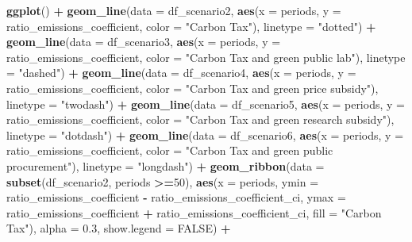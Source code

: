 \documentclass[
]{article}
\newenvironment{Shaded}{\begin{snugshade}}{\end{snugshade}}
\newcommand{\AttributeTok}[1]{\textcolor[rgb]{0.13,0.29,0.53}{#1}}
\newcommand{\ConstantTok}[1]{\textcolor[rgb]{0.56,0.35,0.01}{#1}}
\newcommand{\DecValTok}[1]{\textcolor[rgb]{0.00,0.00,0.81}{#1}}
\newcommand{\FloatTok}[1]{\textcolor[rgb]{0.00,0.00,0.81}{#1}}
\newcommand{\FunctionTok}[1]{\textcolor[rgb]{0.13,0.29,0.53}{\textbf{#1}}}
\newcommand{\NormalTok}[1]{#1}
\newcommand{\SpecialCharTok}[1]{\textcolor[rgb]{0.81,0.36,0.00}{\textbf{#1}}}
\newcommand{\StringTok}[1]{\textcolor[rgb]{0.31,0.60,0.02}{#1}}
\begin{document}
\begin{Shaded}
\begin{Highlighting}[]
\FunctionTok{ggplot}\NormalTok{() }\SpecialCharTok{+}
  \FunctionTok{geom\_line}\NormalTok{(}\AttributeTok{data =}\NormalTok{ df\_scenario2, }\FunctionTok{aes}\NormalTok{(}\AttributeTok{x =}\NormalTok{ periods, }\AttributeTok{y =}\NormalTok{ ratio\_emissions\_coefficient, }\AttributeTok{color =} \StringTok{"Carbon Tax"}\NormalTok{), }\AttributeTok{linetype =} \StringTok{"dotted"}\NormalTok{) }\SpecialCharTok{+}
  \FunctionTok{geom\_line}\NormalTok{(}\AttributeTok{data =}\NormalTok{ df\_scenario3, }\FunctionTok{aes}\NormalTok{(}\AttributeTok{x =}\NormalTok{ periods, }\AttributeTok{y =}\NormalTok{ ratio\_emissions\_coefficient, }\AttributeTok{color =} \StringTok{"Carbon Tax and green public lab"}\NormalTok{), }\AttributeTok{linetype =} \StringTok{"dashed"}\NormalTok{) }\SpecialCharTok{+}
  \FunctionTok{geom\_line}\NormalTok{(}\AttributeTok{data =}\NormalTok{ df\_scenario4, }\FunctionTok{aes}\NormalTok{(}\AttributeTok{x =}\NormalTok{ periods, }\AttributeTok{y =}\NormalTok{ ratio\_emissions\_coefficient, }\AttributeTok{color =} \StringTok{"Carbon Tax and green price subsidy"}\NormalTok{), }\AttributeTok{linetype =} \StringTok{"twodash"}\NormalTok{) }\SpecialCharTok{+}
  \FunctionTok{geom\_line}\NormalTok{(}\AttributeTok{data =}\NormalTok{ df\_scenario5, }\FunctionTok{aes}\NormalTok{(}\AttributeTok{x =}\NormalTok{ periods, }\AttributeTok{y =}\NormalTok{ ratio\_emissions\_coefficient, }\AttributeTok{color =} \StringTok{"Carbon Tax and green research subsidy"}\NormalTok{), }\AttributeTok{linetype =} \StringTok{"dotdash"}\NormalTok{) }\SpecialCharTok{+}
  \FunctionTok{geom\_line}\NormalTok{(}\AttributeTok{data =}\NormalTok{ df\_scenario6, }\FunctionTok{aes}\NormalTok{(}\AttributeTok{x =}\NormalTok{ periods, }\AttributeTok{y =}\NormalTok{ ratio\_emissions\_coefficient, }\AttributeTok{color =} \StringTok{"Carbon Tax and green public procurement"}\NormalTok{), }\AttributeTok{linetype =} \StringTok{"longdash"}\NormalTok{) }\SpecialCharTok{+}
  \FunctionTok{geom\_ribbon}\NormalTok{(}\AttributeTok{data =} \FunctionTok{subset}\NormalTok{(df\_scenario2, periods }\SpecialCharTok{\textgreater{}=}\DecValTok{50}\NormalTok{), }\FunctionTok{aes}\NormalTok{(}\AttributeTok{x =}\NormalTok{ periods, }\AttributeTok{ymin =}\NormalTok{ ratio\_emissions\_coefficient }\SpecialCharTok{{-}}\NormalTok{ ratio\_emissions\_coefficient\_ci, }\AttributeTok{ymax =}\NormalTok{ ratio\_emissions\_coefficient }\SpecialCharTok{+}\NormalTok{ ratio\_emissions\_coefficient\_ci, }\AttributeTok{fill =} \StringTok{"Carbon Tax"}\NormalTok{), }\AttributeTok{alpha =} \FloatTok{0.3}\NormalTok{, }\AttributeTok{show.legend =} \ConstantTok{FALSE}\NormalTok{) }\SpecialCharTok{+}

\end{Highlighting}
\end{Shaded}
\end{document}
